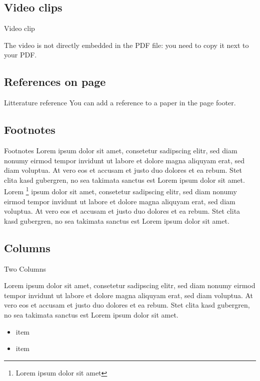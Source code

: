 \documentclass[compress]{beamer}
\begin{document}
\subsection{Video clips}

\begin{frame}{Video clip}
    \centering

    The video is not directly embedded in the PDF file: you need to copy it next
    to your PDF.

\end{frame}



\subsection{References on page}

{

    \begin{frame}{Litterature reference}
        You can add a reference to a paper in the page footer.
    \end{frame}
}

\subsection{Footnotes}
\begin{frame}{Footnotes}
    Lorem ipsum dolor sit amet, consetetur sadipscing elitr, sed diam nonumy
    eirmod tempor invidunt ut labore et dolore magna aliquyam erat, sed diam
    voluptua. At vero eos et accusam et justo duo dolores et ea rebum. Stet
    clita kasd gubergren, no sea takimata sanctus est Lorem ipsum dolor sit
    amet. Lorem \footnote{Lorem ipsum dolor sit amet} ipsum dolor sit amet,
    consetetur sadipscing elitr, sed diam nonumy eirmod tempor invidunt ut
    labore et dolore magna aliquyam erat, sed diam voluptua. At vero eos et
    accusam et justo duo dolores et ea rebum. Stet clita kasd gubergren, no sea
    takimata sanctus est Lorem ipsum dolor sit amet.

\end{frame}

\subsection{Columns}
\begin{frame}{Two Columns}
    \begin{multicols}{2}
        Lorem ipsum dolor sit amet, consetetur sadipscing elitr, sed diam nonumy eirmod tempor invidunt ut labore et dolore magna aliquyam erat, sed diam voluptua. At vero eos et accusam et justo duo dolores et ea rebum. Stet clita kasd gubergren, no sea takimata sanctus est Lorem ipsum dolor sit amet.
        \begin{itemize}
            \item item
            \item item
        \end{itemize}
    \end{multicols}
\end{frame}
\end{document}
